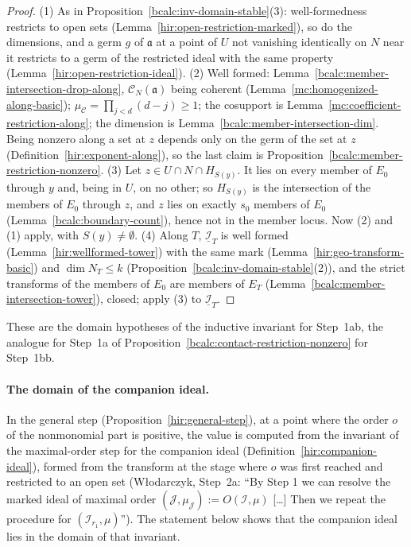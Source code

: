 \begin{proof}
\mixedleanok
(1) As in Proposition~\ref{bcalc:inv-domain-stable}(3): well-formedness restricts to open sets (Lemma~\ref{hir:open-restriction-marked}), so do the dimensions, and a germ \(g\)
of \(\mathfrak a\) at a point of \(U\) not vanishing identically on \(N\) near it restricts to a germ of the restricted ideal with the same property
(Lemma~\ref{hir:open-restriction-ideal}). (2) Well formed: Lemma~\ref{bcalc:member-intersection-drop-along}, \(\mathcal C_N(\mathfrak a)\) being coherent
(Lemma~\ref{mc:homogenized-along-basic}); \(\mu_{\mathcal C}=\prod_{j<d}(d-j)\ge1\); the cosupport is Lemma~\ref{mc:coefficient-restriction-along}; the dimension is
Lemma~\ref{bcalc:member-intersection-dim}. Being nonzero along a set at \(z\) depends only on the germ of the set at \(z\) (Definition~\ref{hir:exponent-along}), so the last
claim is Proposition~\ref{bcalc:member-restriction-nonzero}. (3) Let \(z\in U\cap N\cap H_{S(y)}\). It lies on every member of \(E_0\) through \(y\) and, being in \(U\), on no
other; so \(H_{S(y)}\) is the intersection of the members of \(E_0\) through \(z\), and \(z\) lies on exactly \(s_0\) members of \(E_0\) (Lemma~\ref{bcalc:boundary-count}),
hence not in the member locus. Now (2) and (1) apply, with \(S(y)\ne\emptyset\). (4) Along \(T\), \(\underline{\mathcal I}_T\) is well formed (Lemma~\ref{hir:wellformed-tower}) with
the same mark (Lemma~\ref{hir:geo-transform-basic}) and \(\dim N_T\le k\) (Proposition~\ref{bcalc:inv-domain-stable}(2)), and the strict transforms of the members of \(E_0\) are
members of \(E_T\) (Lemma~\ref{bcalc:member-intersection-tower}), closed; apply (3) to \(\underline{\mathcal I}_T\).
\end{proof}
These are the domain hypotheses of the inductive invariant for Step~1ab, the analogue for Step~1a of Proposition~\ref{bcalc:contact-restriction-nonzero} for Step~1bb.

\paragraph{The domain of the companion ideal.} In the general step (Proposition~\ref{hir:general-step}), at a point where the order \(o\) of the nonmonomial
part is positive, the value is computed from the invariant of the maximal-order step for the companion ideal (Definition~\ref{hir:companion-ideal}), formed
from the transform at the stage where \(o\) was first reached and restricted to an open set (Włodarczyk, Step~2a: ``By Step 1 we can resolve the marked
ideal of maximal order \((\mathcal J,\mu_{\mathcal J}):=O(\mathcal I,\mu)\) [\dots] Then we repeat the procedure for \((\mathcal I_{r_1},\mu)\)''). The statement below
shows that the companion ideal lies in the domain of that invariant.

